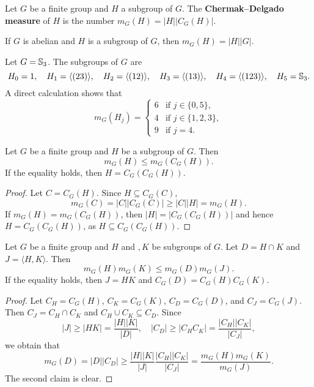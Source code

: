 \begin{definition}
Let $G$ be a finite group and $H$ a subgroup of $G$. 
The \textbf{Chermak--Delgado measure} of $H$ 
is the number 
$m_G(H)=|H||C_G(H)|$.
\end{definition}

\begin{example}
If $G$ is abelian and $H$ is a subgroup of $G$, then 
$m_G(H)=|H||G|$.
\end{example}

\begin{example}
Let $G=\mathbb{S}_3$. The subgroups of $G$ are 
	\[
		H_0=1,\quad
		H_1=\langle (23)\rangle,\quad
		H_2=\langle (12)\rangle,\quad
		H_3=\langle (13)\rangle,\quad
		H_4=\langle (123)\rangle,\quad
		H_5=\mathbb{S}_3.
	\]
	A direct calculation shows that 
	\[
		m_G(H_j)=\begin{cases}
			6 & \text{if $j\in\{0,5\}$},\\
			4 & \text{if $j\in\{1,2,3\}$},\\
			9 & \text{if $j=4$}.
		\end{cases}
	\]
\end{example}

\begin{lemma}
\label{lem:CD1}
Let $G$ be a finite group and $H$ be a subgroup of $G$. Then 
\[
m_G(H)\leq m_G(C_G(H)).
\]
If the equality holds, then $H=C_G(C_G(H))$.
\end{lemma}

\begin{proof}
Let $C=C_G(H)$. 
Since $H\subseteq C_G(C)$, 
\[
m_G(C)=|C||C_G(C)|\geq |C||H|=m_G(H). 
\]
If $m_G(H)=m_G(C_G(H))$, then $|H|=|C_G(C_G(H))|$ and 
hence $H=C_G(C_G(H))$, as $H\subseteq C_G(C_G(H))$. 
\end{proof}

\begin{lemma}
	Let $G$ be a finite group and 
	$H$ and $,K$ be subgroups of $G$. Let $D=H\cap K$ and
    $J=\langle H,K\rangle$. Then 
	\[
		m_G(H)m_G(K)\leq m_G(D)m_G(J).
	\]
	If the equality holds, then $J=HK$ and $C_G(D)=C_G(H)C_G(K)$.
	\label{lem:CD2}
\end{lemma}

\begin{proof}
	Let $C_H=C_G(H)$, $C_K=C_G(K)$, $C_D=C_G(D)$, and $C_J=C_G(J)$. Then
	$C_J=C_H\cap C_K$ and $C_H\cup C_K\subseteq C_D$. Since 
	\[
		|J|\geq |HK|=\frac{|H||K|}{|D|},
		\quad
		|C_D|\geq |C_HC_K|=\frac{|C_H||C_K|}{|C_J|},
	\]
	we obtain that 
	\[
		m_G(D)
		=|D||C_D|\geq \frac{|H||K|}{|J|}\frac{|C_H||C_K|}{|C_J|}
		=\frac{m_G(H)m_G(K)}{m_G(J)}.
	\]
	The second claim is clear. 
\end{proof}

